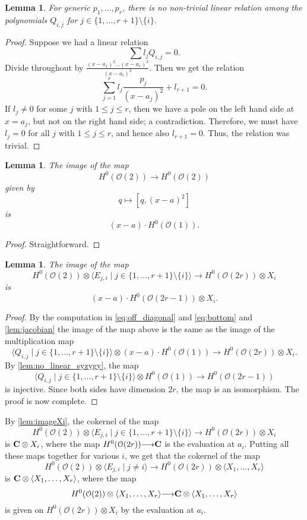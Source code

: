 \documentclass[11pt,reqno]{amsart}
\theoremstyle{plain}
\newtheorem{lemma}[theorem]{Lemma}
\theoremstyle{definition}
\theoremstyle{remark}
\numberwithin{equation}{section}
\renewcommand{\to}{{\longrightarrow}}
\numberwithin{equation}{section}
\renewcommand{\O}{\mathcal O}
\begin{document}
\begin{lemma}\label{lem:no_linear_syzygy}
  For generic $p_1, \dots, p_r$, there is no non-trivial linear relation among the polynomials $Q_{i,j}$ for $j \in \{1, \dots, r+1\} \setminus \{i\}$.
\end{lemma}
\begin{proof}
  Suppose we had a linear relation
  \[ \sum l_j Q_{i,j} = 0.\]
  Divide throughout by $\frac{(x-a_1)^2 \dots (x-a_r)^2}{(x-a_i)^2}$.
  Then we get the relation
  \[ \sum_{j=1}^r l_j \frac{p_j}{(x-a_j)^2} + l_{r+1} = 0.\]
  If $l_j \neq 0$ for some $j$ with $1 \leq j \leq r$, then we have a pole on the left hand side at $x = a_j$, but not on the right hand side; a contradiction.
  Therefore, we must have $l_j = 0$ for all $j$ with $1 \leq j \leq r$, and hence also $l_{r+1} = 0$.
  Thus, the relation was trivial.
\end{proof}
\begin{lemma}\label{lem:jacobian}
  The image of the map
  \[ H^0(\O(2)) \to H^0(\O(2))\]
  given by
  \[ q \mapsto [q, (x-a)^2]\]
  is
  \[ (x-a) \cdot H^0(\O(1)).\]
\end{lemma}
\begin{proof}
  Straightforward.
\end{proof}
\begin{lemma}\label{lem:imageXi}
  The image of the map
  \[ H^0(\O(2)) \otimes \langle  E_{j,i} \mid j \in \{1, \dots, r+1\} \setminus \{i\} \rangle \to H^0(\O(2r)) \otimes X_i\]
  is
  \[ (x-a) \cdot H^0(\O(2r-1)) \otimes X_i.\]
\end{lemma}
\begin{proof}
  By the computation in \eqref{eq:off_diagonal} and \eqref{eq:bottom} and \autoref{lem:jacobian} the image of the map above is the same as the image of the multiplication map
  \[ \langle Q_{i,j} \mid j \in \{1, \dots, r+1\} \setminus \{i\} \rangle \otimes (x-a) \cdot H^0(\O(1)) \to H^0(\O(2r)) \otimes X_i.\]
  By \autoref{lem:no_linear_syzygy}, the map
  \[ \langle Q_{i,j} \mid j \in \{1, \dots, r+1\} \setminus \{i\} \rangle \otimes H^0(\O(1)) \to H^0(\O(2r-1))\]
  is injective.
  Since both sides have dimension $2r$, the map is an isomorphism.
  The proof is now complete.
\end{proof}

By \autoref{lem:imageXi}, the cokernel of the map
\[ H^0(\O(2)) \otimes \langle  E_{j,i} \mid j \in \{1, \dots, r+1\} \setminus \{i\} \rangle \to H^0(\O(2r)) \otimes X_i\]
is ${\bf C} \otimes X_i$, where the map $H^0(\O(2r)) \to \C$ is the evaluation at $a_i$.
Putting all these maps together for various $i$, we get that the cokernel of the map
\[ H^0(\O(2)) \otimes \langle  E_{j,i} \mid j \neq i \rangle \to H^0(\O(2r)) \otimes \langle  X_1, \dots, X_r \rangle\]
is ${\bf C} \otimes \langle  X_1, \dots, X_r \rangle$,
where the map
\begin{equation}\label{eqn:remaining}
  H^0(\O(2)) \otimes \langle  X_1, \dots, X_r \rangle \to \C \otimes \langle  X_1, \dots, X_r \rangle
\end{equation}
is given on $H^0(\O(2r)) \otimes X_i$ by the evaluation at $a_i$.
\end{document}
